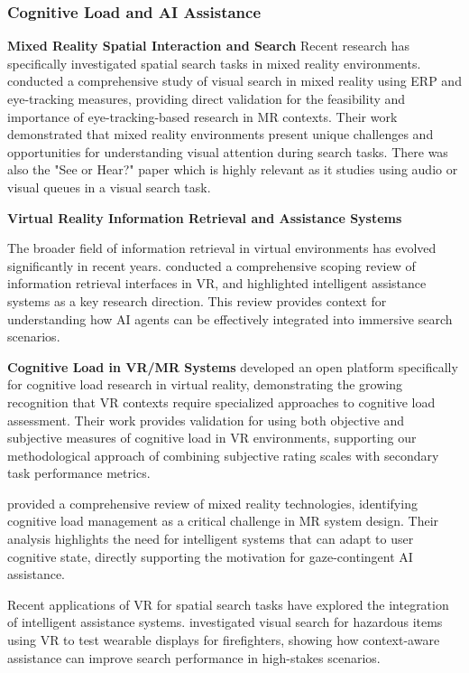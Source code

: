\documentclass[12pt,letterpaper]{article}
\begin{document}
\subsubsection{Cognitive Load and AI Assistance}


\textbf{Mixed Reality Spatial Interaction and Search}
Recent research has specifically investigated spatial search tasks in mixed reality environments. \citet{chiossi2024searching} conducted a comprehensive study of visual search in mixed reality using ERP and eye-tracking measures, providing direct validation for the feasibility and importance of eye-tracking-based research in MR contexts. Their work demonstrated that mixed reality environments present unique challenges and opportunities for understanding visual attention during search tasks. There was also the "See or Hear?" paper which is highly relevant as it studies using audio or visual queues in a visual search task.

\textbf{Virtual Reality Information Retrieval and Assistance Systems}

The broader field of information retrieval in virtual environments has evolved significantly in recent years. \citet{schleusissinger2021information} conducted a comprehensive scoping review of information retrieval interfaces in VR, and highlighted intelligent assistance systems as a key research direction. This review provides context for understanding how AI agents can be effectively integrated into immersive search scenarios.

\textbf{Cognitive Load in VR/MR Systems}
\citet{augereau2022open} developed an open platform specifically for cognitive load research in virtual reality, demonstrating the growing recognition that VR contexts require specialized approaches to cognitive load assessment. Their work provides validation for using both objective and subjective measures of cognitive load in VR environments, supporting our methodological approach of combining subjective rating scales with secondary task performance metrics.

\citet{rokhsaritalemi2020review} provided a comprehensive review of mixed reality technologies, identifying cognitive load management as a critical challenge in MR system design. Their analysis highlights the need for intelligent systems that can adapt to user cognitive state, directly supporting the motivation for gaze-contingent AI assistance.

Recent applications of VR for spatial search tasks have explored the integration of intelligent assistance systems. \citet{feder2024visual} investigated visual search for hazardous items using VR to test wearable displays for firefighters, showing how context-aware assistance can improve search performance in high-stakes scenarios.
\end{document}
